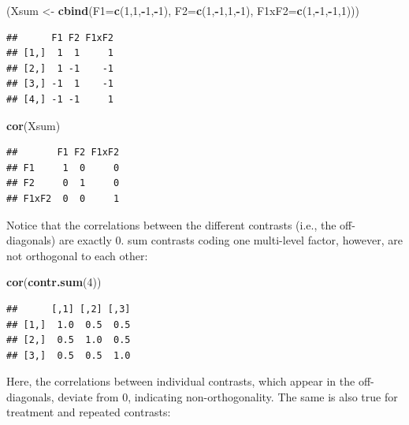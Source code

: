 \documentclass[12pt,]{krantz}
\newenvironment{Shaded}{\begin{snugshade}}{\end{snugshade}}
\newcommand{\KeywordTok}[1]{\textcolor[rgb]{0.13,0.29,0.53}{\textbf{#1}}}
\newcommand{\DataTypeTok}[1]{\textcolor[rgb]{0.13,0.29,0.53}{#1}}
\newcommand{\DecValTok}[1]{\textcolor[rgb]{0.00,0.00,0.81}{#1}}
\newcommand{\StringTok}[1]{\textcolor[rgb]{0.31,0.60,0.02}{#1}}
\newcommand{\OperatorTok}[1]{\textcolor[rgb]{0.81,0.36,0.00}{\textbf{#1}}}
\newcommand{\NormalTok}[1]{#1}
\theoremstyle{definition}
\theoremstyle{definition}
\theoremstyle{definition}
\theoremstyle{remark}
\begin{document}
\begin{Shaded}
\begin{Highlighting}[]
\NormalTok{(Xsum <-}\StringTok{ }\KeywordTok{cbind}\NormalTok{(}\DataTypeTok{F1=}\KeywordTok{c}\NormalTok{(}\DecValTok{1}\NormalTok{,}\DecValTok{1}\NormalTok{,}\OperatorTok{-}\DecValTok{1}\NormalTok{,}\OperatorTok{-}\DecValTok{1}\NormalTok{), }\DataTypeTok{F2=}\KeywordTok{c}\NormalTok{(}\DecValTok{1}\NormalTok{,}\OperatorTok{-}\DecValTok{1}\NormalTok{,}\DecValTok{1}\NormalTok{,}\OperatorTok{-}\DecValTok{1}\NormalTok{), }\DataTypeTok{F1xF2=}\KeywordTok{c}\NormalTok{(}\DecValTok{1}\NormalTok{,}\OperatorTok{-}\DecValTok{1}\NormalTok{,}\OperatorTok{-}\DecValTok{1}\NormalTok{,}\DecValTok{1}\NormalTok{)))}
\end{Highlighting}
\end{Shaded}

\begin{verbatim}
##      F1 F2 F1xF2
## [1,]  1  1     1
## [2,]  1 -1    -1
## [3,] -1  1    -1
## [4,] -1 -1     1
\end{verbatim}

\begin{Shaded}
\begin{Highlighting}[]
\KeywordTok{cor}\NormalTok{(Xsum)}
\end{Highlighting}
\end{Shaded}

\begin{verbatim}
##       F1 F2 F1xF2
## F1     1  0     0
## F2     0  1     0
## F1xF2  0  0     1
\end{verbatim}

\noindent
Notice that the correlations between the different contrasts (i.e., the
off-diagonals) are exactly \(0\). sum contrasts coding one multi-level
factor, however, are not orthogonal to each other:

\begin{Shaded}
\begin{Highlighting}[]
\KeywordTok{cor}\NormalTok{(}\KeywordTok{contr.sum}\NormalTok{(}\DecValTok{4}\NormalTok{))}
\end{Highlighting}
\end{Shaded}

\begin{verbatim}
##      [,1] [,2] [,3]
## [1,]  1.0  0.5  0.5
## [2,]  0.5  1.0  0.5
## [3,]  0.5  0.5  1.0
\end{verbatim}

\noindent
Here, the correlations between individual contrasts, which appear in the
off-diagonals, deviate from \(0\), indicating non-orthogonality. The
same is also true for treatment and repeated contrasts:
\end{document}
